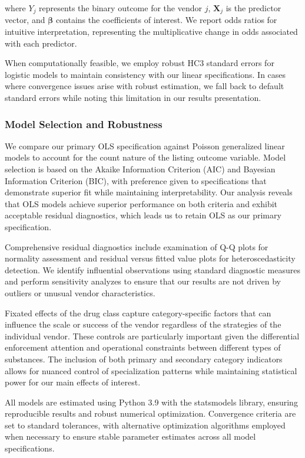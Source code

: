 \documentclass{article}
\begin{document}
where $Y_j$ represents the binary outcome for the vendor $j$, $\mathbf{X}_j$ is the predictor vector, and $\boldsymbol{\beta}$ contains the coefficients of interest. We report odds ratios for intuitive interpretation, representing the multiplicative change in odds associated with each predictor.

When computationally feasible, we employ robust HC3 standard errors for logistic models to maintain consistency with our linear specifications. In cases where convergence issues arise with robust estimation, we fall back to default standard errors while noting this limitation in our results presentation.

\subsubsection{Model Selection and Robustness}

We compare our primary OLS specification against Poisson generalized linear models to account for the count nature of the listing outcome variable. Model selection is based on the Akaike Information Criterion (AIC) and Bayesian Information Criterion (BIC), with preference given to specifications that demonstrate superior fit while maintaining interpretability. Our analysis reveals that OLS models achieve superior performance on both criteria and exhibit acceptable residual diagnostics, which leads us to retain OLS as our primary specification.

Comprehensive residual diagnostics include examination of Q-Q plots for normality assessment and residual versus fitted value plots for heteroscedasticity detection. We identify influential observations using standard diagnostic measures and perform sensitivity analyzes to ensure that our results are not driven by outliers or unusual vendor characteristics.

Fixated effects of the drug class capture category-specific factors that can influence the scale or success of the vendor regardless of the strategies of the individual vendor. These controls are particularly important given the differential enforcement attention and operational constraints between different types of substances. The inclusion of both primary and secondary category indicators allows for nuanced control of specialization patterns while maintaining statistical power for our main effects of interest.

All models are estimated using Python 3.9 with the statsmodels library, ensuring reproducible results and robust numerical optimization. Convergence criteria are set to standard tolerances, with alternative optimization algorithms employed when necessary to ensure stable parameter estimates across all model specifications.
\end{document}
